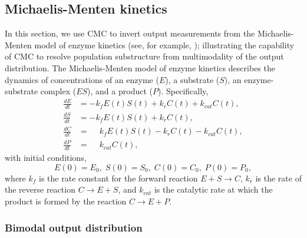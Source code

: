 \subsection{Michaelis-Menten kinetics}
In this section, we use CMC to invert output measurements from the Michaelis-Menten model of enzyme kinetics (see, for example, \cite{murray2007mathematical}); illustrating the capability of CMC to resolve population substructure from multimodality of the output distribution. The Michaelis-Menten model of enzyme kinetics describes the dynamics of concentrations of an enzyme ($E$), a substrate ($S$), an enzyme-substrate complex ($ES$), and a product ($P$). Specifically,
%
\begin{equation}\label{eq:michaelis_menten}
\begin{aligned}
\frac{dE}{dt} &= -k_f E(t)S(t) + k_r C(t) + k_{cat} C(t), \\
\frac{dS}{dt} &= -k_f E(t)S(t) + k_r C(t), \\
\frac{dC}{dt} &= \phantom{-}k_f E(t)S(t) - k_r C(t) - k_{cat} C(t), \\
\frac{dP}{dt} &= \phantom{-}k_{cat} C(t),
\end{aligned}
\end{equation}
%
with initial conditions,
\begin{equation}
E(0) = E_0, \; S(0)=S_0, \; C(0)=C_0, \; P(0)=P_0,
\end{equation}
%
where $k_f$ is the rate constant for the forward reaction $E+S \rightarrow C$, $k_r$ is the rate of the reverse reaction $C \rightarrow E+S$, and $k_{cat}$ is the catalytic rate at which the product is formed by the reaction $C \rightarrow E + P$.


\subsubsection{Bimodal output distribution}

